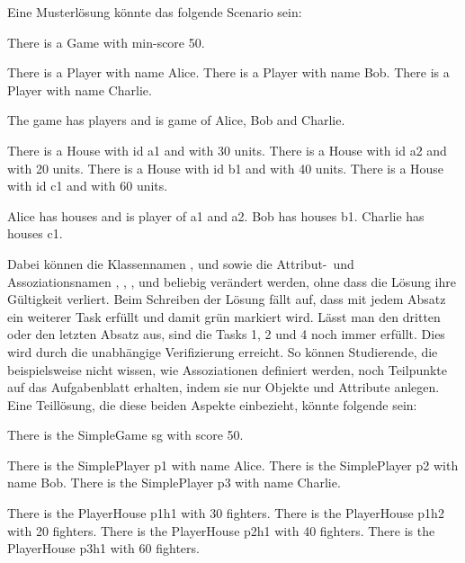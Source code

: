 Eine Musterlösung könnte das folgende Scenario sein:

\begin{mdcodeblock}
    There is a Game with min-score 50.

    There is a Player with name Alice.
    There is a Player with name Bob.
    There is a Player with name Charlie.

    The game has players and is game of Alice, Bob and Charlie.

    There is a House with id a1 and with 30 units.
    There is a House with id a2 and with 20 units.
    There is a House with id b1 and with 40 units.
    There is a House with id c1 and with 60 units.

    Alice has houses and is player of a1 and a2.
    Bob has houses b1.
    Charlie has houses c1.
\end{mdcodeblock}

Dabei können die Klassennamen ,  und  sowie die Attribut-\ und Assoziationsnamen , , ,  und  beliebig verändert werden, ohne dass die Lösung ihre Gültigkeit verliert.
Beim Schreiben der Lösung fällt auf, dass mit jedem Absatz ein weiterer Task erfüllt und damit grün markiert wird.
Lässt man den dritten oder den letzten Absatz aus, sind die Tasks 1, 2 und 4 noch immer erfüllt.
Dies wird durch die unabhängige Verifizierung erreicht.
So können Studierende, die beispielsweise nicht wissen, wie Assoziationen definiert werden, noch Teilpunkte auf das Aufgabenblatt erhalten, indem sie nur Objekte und Attribute anlegen.
Eine Teillösung, die diese beiden Aspekte einbezieht, könnte folgende sein:

\begin{mdcodeblock}
    There is the SimpleGame sg with score 50.

    There is the SimplePlayer p1 with name Alice.
    There is the SimplePlayer p2 with name Bob.
    There is the SimplePlayer p3 with name Charlie.

    There is the PlayerHouse p1h1 with 30 fighters.
    There is the PlayerHouse p1h2 with 20 fighters.
    There is the PlayerHouse p2h1 with 40 fighters.
    There is the PlayerHouse p3h1 with 60 fighters.
\end{mdcodeblock}
